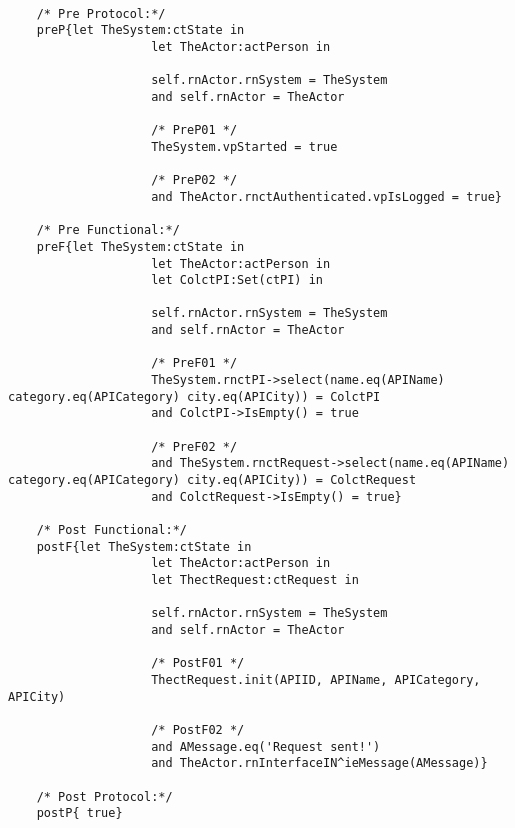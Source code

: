 	\scriptsize
	\vspace{0.5cm}
	\begin{lstlisting}[style=MessirStyle,firstnumber=auto,captionpos=b,caption={\msrmessir (MCL-oriented) specification of the operation \emph{oeSendNewRequest}.},label=OM-actPerson-oeSendNewRequest-MCL-LST]

	/* Pre Protocol:*/ 
	preP{let TheSystem:ctState in
					let TheActor:actPerson in
					
					self.rnActor.rnSystem = TheSystem
					and self.rnActor = TheActor
					
					/* PreP01 */
					TheSystem.vpStarted = true
					
					/* PreP02 */
					and TheActor.rnctAuthenticated.vpIsLogged = true}
	
	/* Pre Functional:*/
	preF{let TheSystem:ctState in
					let TheActor:actPerson in
					let ColctPI:Set(ctPI) in
					
					self.rnActor.rnSystem = TheSystem
					and self.rnActor = TheActor
					
					/* PreF01 */
					TheSystem.rnctPI->select(name.eq(APIName) category.eq(APICategory) city.eq(APICity)) = ColctPI
					and ColctPI->IsEmpty() = true
					
					/* PreF02 */
					and TheSystem.rnctRequest->select(name.eq(APIName) category.eq(APICategory) city.eq(APICity)) = ColctRequest
					and ColctRequest->IsEmpty() = true}
	
	/* Post Functional:*/ 
	postF{let TheSystem:ctState in
					let TheActor:actPerson in
					let ThectRequest:ctRequest in
					
					self.rnActor.rnSystem = TheSystem
					and self.rnActor = TheActor
					
					/* PostF01 */
					ThectRequest.init(APIID, APIName, APICategory, APICity)
					
					/* PostF02 */
					and AMessage.eq('Request sent!')
					and TheActor.rnInterfaceIN^ieMessage(AMessage)}
	
	/* Post Protocol:*/ 
	postP{ true}
	
	\end{lstlisting}
	\normalsize 
	
	
	
	





